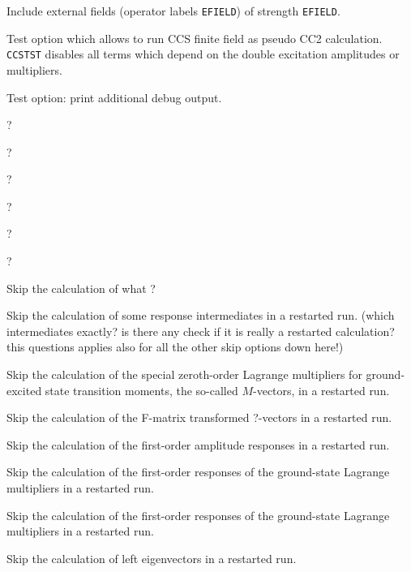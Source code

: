 \begin{description}
    Include external fields (operator labels \verb+EFIELD+)
    of strength \verb+EFIELD+.
 
\item[\Key{CCSTST}] 
   Test option which allows to run CCS finite field as pseudo CC2
   calculation. \verb+CCSTST+ disables all terms which depend on the
   double excitation amplitudes or multipliers.
%
\item[\Key{DEBUG }]  
   Test option: print additional debug output.
%
\item[\Key{NOT2TC}] ?
%
\item[\Key{FSECON}] ? 
%
\item[\Key{FCORE }] ? 
%
\item[\Key{NOCCIT}] ?  
%
\item[\Key{MINSCR}] ?
%
\item[\Key{MINMEM}]  ?
%
%
\item[\Key{SKIP  }]  
   Skip the calculation of what ? 
%
\item[\Key{IMSKIP}] 
   Skip the calculation of some response intermediates
   in a restarted run.
    (which intermediates exactly?
    is there any check if it is really a restarted calculation?
    this questions applies also for all the other skip options
    down here!) 
%
\item[\Key{M1SKIP}] 
   Skip the calculation of the special zeroth-order Lagrange 
   multipliers for ground-excited state transition moments,
   the so-called $M$-vectors, in a restarted run.
%
\item[\Key{FRSKIP}] 
   Skip the calculation of the F-matrix transformed ?-vectors
   in a restarted run.
%
\item[\Key{R1SKIP}] 
   Skip the calculation of the first-order amplitude responses
   in a restarted run.
%
\item[\Key{L1SKIP}] 
   Skip the calculation of the first-order responses of the 
   ground-state Lagrange multipliers in a restarted run.
%
\item[\Key{RESKIP}] 
   Skip the calculation of the first-order responses of the 
   ground-state Lagrange multipliers in a restarted run.
%
\item[\Key{LESKIP}]  
   Skip the calculation of left eigenvectors
   in a restarted run.
%
\item[\Key{F1SKIP}] 

\end{description}
